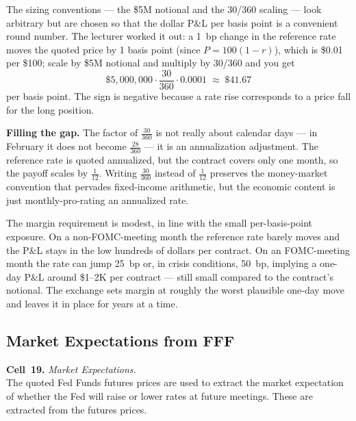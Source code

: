 The sizing conventions --- the \$5M notional and the 30/360 scaling --- look
arbitrary but are chosen so that the dollar P\&L per basis point is a
convenient round number. The lecturer worked it out: a 1~bp change in the
reference rate moves the quoted price by 1 basis point (since
$P = 100(1-r)$), which is \$0.01 per \$100; scale by \$5M notional and
multiply by 30/360 and you get
\[
  \$5{,}000{,}000 \cdot \frac{30}{360} \cdot 0.0001 \;\approx\; \$41.67
\]
per basis point. The sign is negative because a rate rise corresponds to a
price fall for the long position.

\begin{tipblock}
\textbf{Filling the gap.} The factor of $\tfrac{30}{360}$ is not really
about calendar days --- in February it does not become $\tfrac{28}{360}$ ---
it is an annualization adjustment. The reference rate is quoted
annualized, but the contract covers only one month, so the payoff scales
by $\tfrac{1}{12}$. Writing $\tfrac{30}{360}$ instead of $\tfrac{1}{12}$
preserves the money-market convention that pervades fixed-income
arithmetic, but the economic content is just monthly-pro-rating an
annualized rate.
\end{tipblock}

The margin requirement is modest, in line with the small per-basis-point
exposure. On a non-FOMC-meeting month the reference rate barely moves and
the P\&L stays in the low hundreds of dollars per contract. On an
FOMC-meeting month the rate can jump 25~bp or, in crisis conditions,
50~bp, implying a one-day P\&L around \$1--2K per contract --- still small
compared to the contract's notional. The exchange sets margin at roughly
the worst plausible one-day move and leaves it in place for years at a
time.

\subsection{Market Expectations from FFF}\label{L3-sec:stir-market-exp}

\begin{keyblock}
\textbf{Cell~19.} \emph{Market Expectations.}\\
The quoted Fed Funds futures prices are used to extract the market
expectation of whether the Fed will raise or lower rates at future meetings.
These are extracted from the futures prices.
\end{keyblock}

